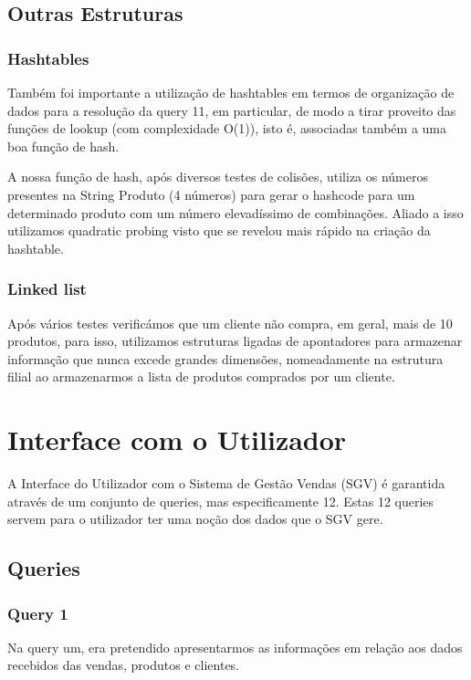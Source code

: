 \documentclass[a4paper,11pt]{report}
\begin{document}
\section{Outras Estruturas}

\subsection{Hashtables}
\quad Também foi importante a utilização de hashtables em termos de organização de dados para a resolução da query 11, em particular, de modo a tirar proveito das funções de lookup (com complexidade O(1)), isto é, associadas também a uma boa função de hash.

A nossa função de hash, após diversos testes de colisões, utiliza os números presentes na String Produto (4 números) para gerar o hashcode para um determinado produto com um número elevadíssimo de combinações. Aliado a isso utilizamos quadratic probing visto que se revelou mais rápido na criação da hashtable.

\subsection{Linked list}
\quad Após vários testes verificámos que um cliente não compra, em geral, mais de 10 produtos, para isso, utilizamos estruturas ligadas de apontadores para armazenar informação que nunca excede grandes dimensões, nomeadamente na estrutura filial ao armazenarmos a lista de produtos comprados por um cliente.



\chapter{Interface com o Utilizador}
\quad A Interface do Utilizador com o Sistema de Gestão Vendas (SGV) é garantida através de um conjunto de queries, mas especificamente 12. Estas 12 queries servem para o utilizador ter uma noção dos dados que o SGV gere.


\section{Queries}
\label{sec:Queries}

\subsection*{Query 1}
\label{sec:Query1}

Na query um, era pretendido apresentarmos as informações em relação aos dados recebidos das vendas, produtos e clientes.
\end{document}

